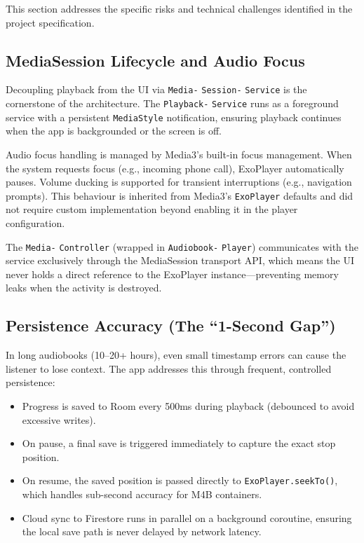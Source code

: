 \documentclass[11pt,a4paper]{article}
\begin{document}
This section addresses the specific risks and technical challenges identified in the project specification.

\subsection{MediaSession Lifecycle and Audio Focus}

Decoupling playback from the UI via \texttt{Media-} \texttt{Session-} \texttt{Service} is the cornerstone of the architecture. The \texttt{Playback-} \texttt{Service} runs as a foreground service with a persistent \texttt{MediaStyle} notification, ensuring playback continues when the app is backgrounded or the screen is off.

Audio focus handling is managed by Media3's built-in focus management. When the system requests focus (e.g., incoming phone call), ExoPlayer automatically pauses. Volume ducking is supported for transient interruptions (e.g., navigation prompts). This behaviour is inherited from Media3's \texttt{ExoPlayer} defaults and did not require custom implementation beyond enabling it in the player configuration.

The \texttt{Media-} \texttt{Controller} (wrapped in \texttt{Audiobook-} \texttt{Player}) communicates with the service exclusively through the MediaSession transport API, which means the UI never holds a direct reference to the ExoPlayer instance---preventing memory leaks when the activity is destroyed.

\subsection{Persistence Accuracy (The ``1-Second Gap'')}

In long audiobooks (10--20+ hours), even small timestamp errors can cause the listener to lose context. The app addresses this through frequent, controlled persistence:

\begin{itemize}[noitemsep]
    \item Progress is saved to Room every 500ms during playback (debounced to avoid excessive writes).
    \item On pause, a final save is triggered immediately to capture the exact stop position.
    \item On resume, the saved position is passed directly to \texttt{ExoPlayer.seekTo()}, which handles sub-second accuracy for M4B containers.
    \item Cloud sync to Firestore runs in parallel on a background coroutine, ensuring the local save path is never delayed by network latency.
\end{itemize}
\end{document}
